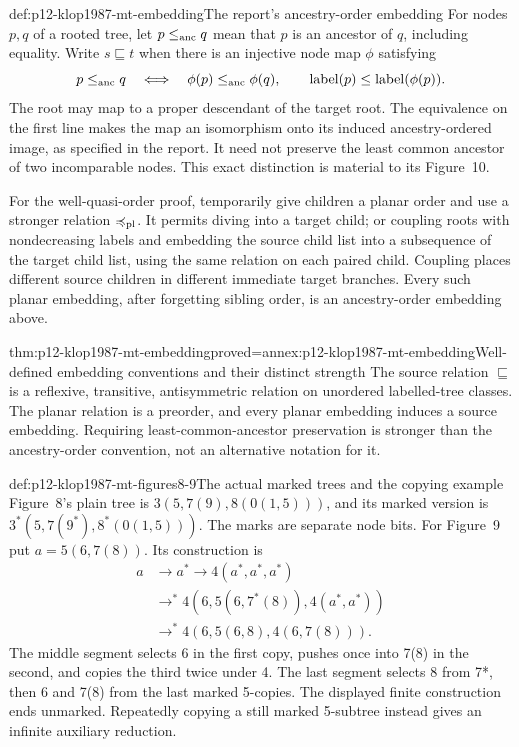\begin{hbdefinition}{def:p12-klop1987-mt-embedding}{The report's ancestry-order embedding}
For nodes \(p,q\) of a rooted tree, let \(p\leq_{\rm anc}q\)
mean that \(p\) is an ancestor of \(q\), including equality.
Write \(s\sqsubseteq t\) when there is an injective node map
\(\phi\) satisfying
\[
 p\leq_{\rm anc}q\quad\Longleftrightarrow\quad
 \phi(p)\leq_{\rm anc}\phi(q),\qquad
 \operatorname{label}(p)\leq\operatorname{label}(\phi(p)).
\]
The root may map to a proper descendant of the target root.
The equivalence on the first line makes the map an isomorphism onto
its induced ancestry-ordered image, as specified in the report.
It need not preserve the least common ancestor of two incomparable
nodes. This exact distinction is material to its Figure~10.

For the well-quasi-order proof, temporarily give children a planar
order and use a stronger relation \(\preccurlyeq_{\rm pl}\).
It permits diving into a target child; or coupling roots with
nondecreasing labels and embedding the source child list into a
subsequence of the target child list, using the same relation on
each paired child. Coupling places different source children in
different immediate target branches. Every such planar embedding,
after forgetting sibling order, is an ancestry-order embedding above.
\end{hbdefinition}

\begin{hblemma}{thm:p12-klop1987-mt-embedding}{proved=annex:p12-klop1987-mt-embedding}{Well-defined embedding conventions and their distinct strength}
The source relation \(\sqsubseteq\) is a reflexive, transitive,
antisymmetric relation on unordered labelled-tree classes. The planar
relation is a preorder, and every planar embedding induces a source
embedding. Requiring least-common-ancestor preservation is stronger
than the ancestry-order convention, not an alternative notation for it.
\end{hblemma}

\begin{hbexample}{def:p12-klop1987-mt-figures8-9}{The actual marked trees and the copying example}
Figure~8's plain tree is \(3(5,7(9),8(0(1,5)))\), and its marked
version is \(3^*(5,7(9^*),8^*(0(1,5)))\). The marks are separate
node bits. For Figure~9 put \(a=5(6,7(8))\). Its construction is
\begin{align*}
 a&\to a^*\to4(a^*,a^*,a^*)\\
 &\to^*4(6,5(6,7^*(8)),4(a^*,a^*))\\
 &\to^*4(6,5(6,8),4(6,7(8))).
\end{align*}
The middle segment selects 6 in the first copy, pushes once into 7(8)
in the second, and copies the third twice under 4. The last segment
selects 8 from 7*, then 6 and 7(8) from the last marked 5-copies.
The displayed finite construction ends unmarked. Repeatedly copying
a still marked 5-subtree instead gives an infinite auxiliary reduction.
\end{hbexample}


